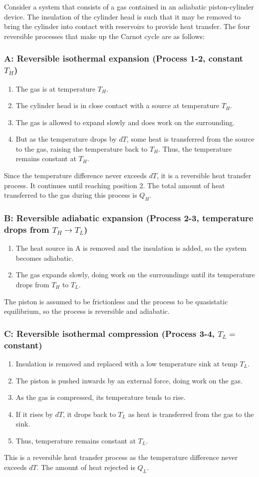 \documentclass[class=report, crop=false, 12pt,a4paper]{standalone}
\begin{document}
Consider a system that consists of a gas contained in an adiabatic piston-cylinder device. The insulation of the cylinder head is such that it may be removed to bring the cylinder into contact with reservoirs to provide heat transfer. The four reversible processes that make up the Carnot cycle are as follows: 
\subsubsection{A: Reversible isothermal expansion (Process 1-2, constant $T_H$)}
\begin{enumerate}[noitemsep]
  \item The gas is at temperature $T_H$.
  \item The cylinder head is in close contact with a source at temperature $T_H$.
  \item The gas is allowed to expand slowly and does work on the surrounding.
  \item But as the temperature drops by $dT$, some heat is transferred from the source to the gas, raising the temperature back to $T_H$. Thus, the temperature remains constant at $T_H$.
\end{enumerate}
Since the temperature difference never exceeds $dT$, it is a reversible heat transfer process. It continues until reaching position 2. The total amount of heat transferred to the gas during this process is $Q_H$.
\subsubsection{B: Reversible adiabatic expansion (Process 2-3, temperature drops from $T_H \rightarrow T_L$)}
\begin{enumerate}[noitemsep]
  \item The heat source in A is removed and the insulation is added, so the system becomes adiabatic. 
  \item The gas expands slowly, doing work on the surroundings until its temperature drops from $T_H$ to $T_L$.
\end{enumerate}
The piston is assumed to be frictionless and the process to be quasistatic equilibrium, so the process is reversible and adiabatic. 
\subsubsection{C: Reversible isothermal compression (Process 3-4, $T_L =$ constant)}
\begin{enumerate}[noitemsep]
  \item Insulation is removed and replaced with a low temperature sink at temp $T_L$.
  \item The piston is pushed inwards by an external force, doing work on the gas.
  \item As the gas is compressed, its temperature tends to rise. 
  \item If it rises by $dT$, it drops back to $T_L$ as heat is transferred from the gas to the sink.
  \item Thus, temperature remains constant at $T_L$.
\end{enumerate}
This is a reversible heat transfer process as the temperature difference never exceeds $dT$. The amount of heat rejected is $Q_L$.
\end{document}
